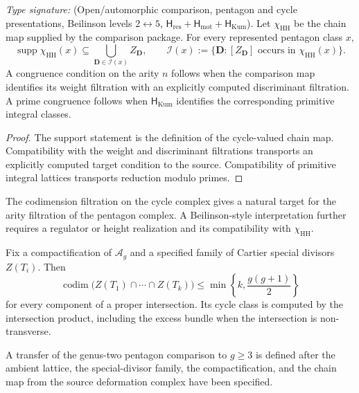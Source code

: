 \begin{proposition}
\label{prop:humbert-heegner-admissibility-filter}
%
\ClaimStatusConditional
\emph{Type signature:}
\textup{(Open/automorphic comparison, pentagon and cycle
presentations, Beilinson levels \(2\leftrightarrow5\),
\(\mathsf H_{\mathrm{res}}+\mathsf H_{\mathrm{mot}}
+\mathsf H_{\mathrm{Kum}}\)).}
Let \(\chi_{\mathrm{HH}}\) be the chain map supplied by the comparison
package.  For every represented pentagon class \(x\),
\[
 \operatorname{supp}\chi_{\mathrm{HH}}(x)
 \subseteq
 \bigcup_{\mathbf D\in\mathcal I(x)} Z_{\mathbf D},
 \qquad
 \mathcal I(x):=\{\mathbf D:[Z_{\mathbf D}]
 \text{ occurs in }\chi_{\mathrm{HH}}(x)\}.
\]
A congruence condition on the arity \(n\) follows when the comparison
map identifies its weight filtration with an explicitly computed
discriminant filtration.  A prime congruence follows when
\(\mathsf H_{\mathrm{Kum}}\) identifies the corresponding primitive
integral classes.
\end{proposition}

\begin{proof}
The support statement is the definition of the cycle-valued chain
map.  Compatibility with the weight and discriminant filtrations
transports an explicitly computed target condition to the source.
Compatibility of primitive integral lattices transports reduction
modulo primes.
\end{proof}

\begin{remark}
\label{rem:humbert-heegner-manin-beilinson}
The codimension filtration on the cycle complex gives a natural target
for the arity filtration of the pentagon complex.  A Beilinson-style
interpretation further requires a regulator or height realization and
its compatibility with \(\chi_{\mathrm{HH}}\).
\end{remark}

\begin{proposition}
\label{thm:humbert-heegner-filter-g-geq-3}
%
\ClaimStatusProvedHere
Fix a compactification of \(\mathcal A_g\) and a specified family of
Cartier special divisors \(Z(T_i)\).  Then
\[
 \operatorname{codim}
 \bigl(Z(T_1)\cap\cdots\cap Z(T_k)\bigr)
 \le
 \min\!\left\{k,\frac{g(g+1)}2\right\}
\]
for every component of a proper intersection.  Its cycle class is
computed by the intersection product, including the excess bundle
when the intersection is non-transverse.

A transfer of the genus-two pentagon comparison to \(g\ge3\) is
defined after the ambient lattice, the special-divisor family, the
compactification, and the chain map from the source deformation
complex have been specified.
\end{proposition}

